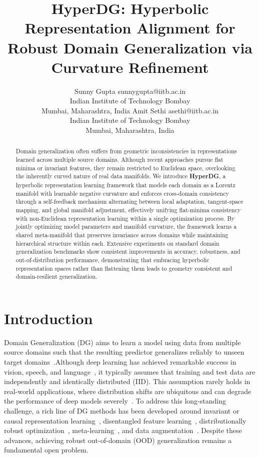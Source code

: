 \documentclass[10pt]{article} %
\title{HyperDG: Hyperbolic Representation Alignment for Robust Domain Generalization via Curvature Refinement}
\author{\name Sunny Gupta \email sunnygupta@iitb.ac.in \\
  \addr Indian Institute of Technology Bombay \\
  Mumbai, Maharashtra, India
  \AND
  \name Amit Sethi \email asethi@iitb.ac.in \\
  \addr Indian Institute of Technology Bombay \\
  Mumbai, Maharashtra, India}
\begin{document}
\maketitle

\begin{abstract}
Domain generalization often suffers from geometric inconsistencies in representations learned across multiple source domains. 
Although recent approaches pursue flat minima or invariant features, they remain restricted to Euclidean space, overlooking the inherently curved nature of real data manifolds. We introduce \textbf{HyperDG}, a hyperbolic representation learning framework that models each domain as a Lorentz manifold with learnable negative curvature and enforces cross-domain consistency through a self-feedback mechanism alternating between local adaptation, tangent-space mapping, and global manifold adjustment, effectively unifying flat-minima consistency with non-Euclidean representation learning within a single optimization process. 
By jointly optimizing model parameters and manifold curvature, the framework learns a shared meta-manifold that preserves invariance across domains while maintaining hierarchical structure within each. 
Extensive experiments on standard domain generalization benchmarks show consistent improvements in accuracy, robustness, and out-of-distribution performance, demonstrating that embracing hyperbolic representation spaces rather than flattening them leads to geometry consistent and domain-resilient generalization.
\end{abstract}

\section{Introduction}
\label{sec:intro}

Domain Generalization (DG) aims to learn a model using data from multiple source domains such that the resulting predictor generalizes reliably to unseen target domains~\cite{wang2022generalizing}.Although deep learning has achieved remarkable success in vision, speech, and language~\cite{kamath2019deep,lopez2017deep,voulodimos2018deep,zhang2018deep}, it typically assumes that training and test data are independently and identically distributed (IID). This assumption rarely holds in real-world applications, where distribution shifts are ubiquitous and can degrade the performance of deep models severely~\cite{wang2022generalizing}. To address this long-standing challenge, a rich line of DG methods has been developed around invariant or causal representation learning~\cite{arjovsky2019invariant,ganin2016domain,zhang2021deep}, disentangled feature learning~\cite{bai2021decaug,nam2021reducing}, distributionally robust optimization~\cite{sagawa2019distributionally}, meta-learning~\cite{balaji2018metareg,du2020learning,li2018learning}, and data augmentation~\cite{volpi2018generalizing,zhang2017mixup}. Despite these advances, achieving robust out-of-domain (OOD) generalization remains a fundamental open problem.
\end{document}
